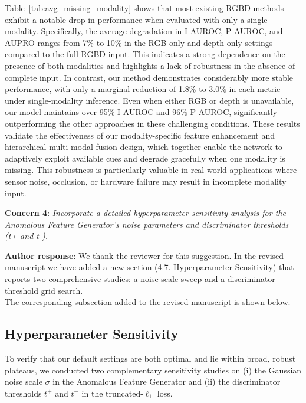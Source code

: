 \documentclass[a4paper,fleqnn]{cas-sc}
\begin{document}
\noindent
Table~\ref{tab:avg_missing_modality} shows that most existing RGBD methods exhibit a notable drop in performance when evaluated with only a single modality. Specifically, the average degradation in I-AUROC, P-AUROC, and AUPRO ranges from 7\% to 10\% in the RGB-only and depth-only settings compared to the full RGBD input. This indicates a strong dependence on the presence of both modalities and highlights a lack of robustness in the absence of complete input. In contrast, our method demonstrates considerably more stable performance, with only a marginal reduction of 1.8\% to 3.0\% in each metric under single-modality inference. Even when either RGB or depth is unavailable, our model maintains over 95\% I-AUROC and 96\% P-AUROC, significantly outperforming the other approaches in these challenging conditions. These results validate the effectiveness of our modality-specific feature enhancement and hierarchical multi-modal fusion design, which together enable the network to adaptively exploit available cues and degrade gracefully when one modality is missing. This robustness is particularly valuable in real-world applications where sensor noise, occlusion, or hardware failure may result in incomplete modality input.

\vspace{1em}

\noindent \textbf{\underline{Concern 4}}: \textit{Incorporate a detailed hyperparameter sensitivity analysis for the Anomalous Feature Generator's noise parameters and discriminator thresholds (t+ and t-). \\}

\noindent \textbf{Author response}: We thank the reviewer for this suggestion. In the revised manuscript we have added a new section (4.7. Hyperparameter Sensitivity) that reports two comprehensive studies: a noise-scale sweep and a discriminator-threshold grid search. \\

The corresponding subsection added to the revised manuscript is shown below. \\

\setcounter{section}{4}
\setcounter{subsection}{6}

\subsection{Hyperparameter Sensitivity}

To verify that our default settings are both optimal and lie within broad, robust plateaus, we conducted two complementary sensitivity studies on (i) the Gaussian noise scale $\sigma$ in the Anomalous Feature Generator and (ii) the discriminator thresholds $t^+$ and $t^-$ in the truncated-$\ell_1$ loss.
\end{document}
